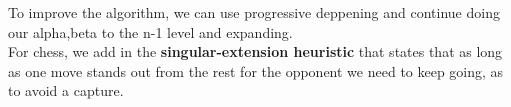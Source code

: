 \documentclass[11pt]{article}
\begin{document}
To improve the algorithm, we can use progressive deppening and continue doing our alpha,beta to the n-1 level and expanding. \\
For chess, we add in the \textbf{singular-extension heuristic} that states that as long as one move stands out from the rest for the opponent we need to keep going, as to avoid a capture. \\
\end{document}
